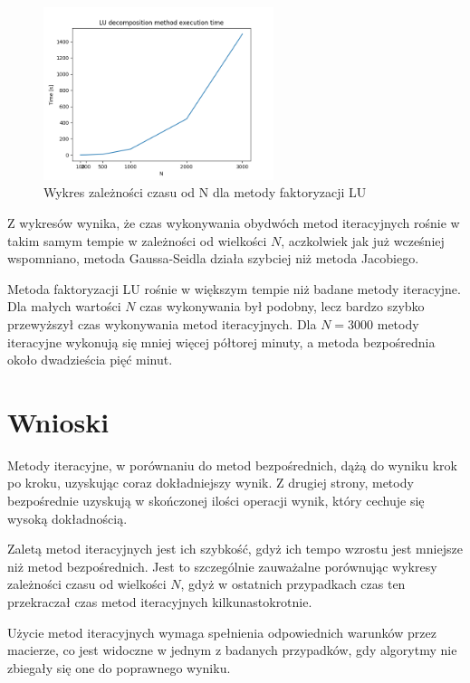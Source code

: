 \documentclass{article}
\begin{document}
\begin{figure}[h!]
  \centering
  \includegraphics[width=0.6\textwidth]{img/lu.png}
  \caption{Wykres zależności czasu od N dla metody faktoryzacji LU}
\end{figure}

Z wykresów wynika, że czas wykonywania obydwóch metod iteracyjnych rośnie w takim samym tempie w zależności od wielkości $N$, aczkolwiek jak już wcześniej wspomniano, metoda Gaussa-Seidla działa szybciej niż metoda Jacobiego.

Metoda faktoryzacji LU rośnie w większym tempie niż badane metody iteracyjne. Dla małych wartości $N$ czas wykonywania był podobny, lecz bardzo szybko przewyższył czas wykonywania metod iteracyjnych. Dla $N=3000$ metody iteracyjne wykonują się mniej więcej półtorej minuty, a metoda bezpośrednia około dwadzieścia pięć minut.

\section{Wnioski}

Metody iteracyjne, w porównaniu do metod bezpośrednich, dążą do wyniku krok po kroku, uzyskując coraz dokładniejszy wynik. Z drugiej strony, metody bezpośrednie uzyskują w skończonej ilości operacji wynik, który cechuje się wysoką dokładnością. 

Zaletą metod iteracyjnych jest ich szybkość, gdyż ich tempo wzrostu jest mniejsze niż metod bezpośrednich. Jest to szczególnie zauważalne porównując wykresy zależności czasu od wielkości $N$, gdyż w ostatnich przypadkach czas ten przekraczał czas metod iteracyjnych kilkunastokrotnie. 

Użycie metod iteracyjnych wymaga spełnienia odpowiednich warunków przez macierze, co jest widoczne w jednym z badanych przypadków, gdy algorytmy nie zbiegały się one do poprawnego wyniku.
\end{document}
